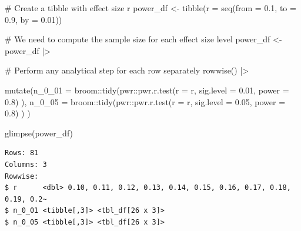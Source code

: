 \documentclass[
  letterpaper,
]{krantz}
\makeatletter
\newenvironment{Shaded}{\begin{snugshade}}{\end{snugshade}}
\newcommand{\AttributeTok}[1]{\textcolor[rgb]{0.40,0.45,0.13}{#1}}
\newcommand{\CommentTok}[1]{\textcolor[rgb]{0.37,0.37,0.37}{#1}}
\newcommand{\FloatTok}[1]{\textcolor[rgb]{0.68,0.00,0.00}{#1}}
\newcommand{\FunctionTok}[1]{\textcolor[rgb]{0.28,0.35,0.67}{#1}}
\newcommand{\NormalTok}[1]{\textcolor[rgb]{0.00,0.23,0.31}{#1}}
\newcommand{\OtherTok}[1]{\textcolor[rgb]{0.00,0.23,0.31}{#1}}
\newcommand{\SpecialCharTok}[1]{\textcolor[rgb]{0.37,0.37,0.37}{#1}}
\newenvironment{kframe}{%
\medskip{}
\setlength{\fboxsep}{.8em}
 \def\at@end@of@kframe{}%
 \ifinner\ifhmode%
  \def\at@end@of@kframe{\end{minipage}}%
  \begin{minipage}{\columnwidth}%
 \fi\fi%
 \def\FrameCommand##1{\hskip\@totalleftmargin \hskip-\fboxsep
 \colorbox{shadecolor}{##1}\hskip-\fboxsep
     \hskip-\linewidth \hskip-\@totalleftmargin \hskip\columnwidth}%
 \MakeFramed {\advance\hsize-\width
   \@totalleftmargin\z@ \linewidth\hsize
   \@setminipage}}%
 {\par\unskip\endMakeFramed%
 \at@end@of@kframe}
\renewenvironment{Shaded}{\begin{kframe}}{\end{kframe}}
\makeatother
\begin{document}
\begin{Shaded}
\begin{Highlighting}[]
\CommentTok{\# Create a tibble with effect size r}
\NormalTok{power\_df }\OtherTok{\textless{}{-}} \FunctionTok{tibble}\NormalTok{(}\AttributeTok{r =} \FunctionTok{seq}\NormalTok{(}\AttributeTok{from =} \FloatTok{0.1}\NormalTok{,}
                           \AttributeTok{to =}  \FloatTok{0.9}\NormalTok{,}
                           \AttributeTok{by =} \FloatTok{0.01}\NormalTok{))}

\CommentTok{\# We need to compute the sample size for each effect size level}
\NormalTok{power\_df }\OtherTok{\textless{}{-}} 
\NormalTok{  power\_df }\SpecialCharTok{|\textgreater{}}
  
  \CommentTok{\# Perform any analytical step for each row separately}
  \FunctionTok{rowwise}\NormalTok{() }\SpecialCharTok{|\textgreater{}}
  
  \FunctionTok{mutate}\NormalTok{(}\AttributeTok{n\_0\_01 =}
\NormalTok{           broom}\SpecialCharTok{::}\FunctionTok{tidy}\NormalTok{(pwr}\SpecialCharTok{::}\FunctionTok{pwr.r.test}\NormalTok{(}\AttributeTok{r =}\NormalTok{ r,}
                            \AttributeTok{sig.level =} \FloatTok{0.01}\NormalTok{,}
                            \AttributeTok{power =} \FloatTok{0.8}\NormalTok{)}
\NormalTok{           ),}
         \AttributeTok{n\_0\_05 =}
\NormalTok{           broom}\SpecialCharTok{::}\FunctionTok{tidy}\NormalTok{(pwr}\SpecialCharTok{::}\FunctionTok{pwr.r.test}\NormalTok{(}\AttributeTok{r =}\NormalTok{ r,}
                            \AttributeTok{sig.level =} \FloatTok{0.05}\NormalTok{,}
                            \AttributeTok{power =} \FloatTok{0.8}\NormalTok{)}
\NormalTok{           )}
\NormalTok{         )}

\FunctionTok{glimpse}\NormalTok{(power\_df)}
\end{Highlighting}
\end{Shaded}

\begin{verbatim}
Rows: 81
Columns: 3
Rowwise: 
$ r      <dbl> 0.10, 0.11, 0.12, 0.13, 0.14, 0.15, 0.16, 0.17, 0.18, 0.19, 0.2~
$ n_0_01 <tibble[,3]> <tbl_df[26 x 3]>
$ n_0_05 <tibble[,3]> <tbl_df[26 x 3]>
\end{verbatim}
\end{document}
